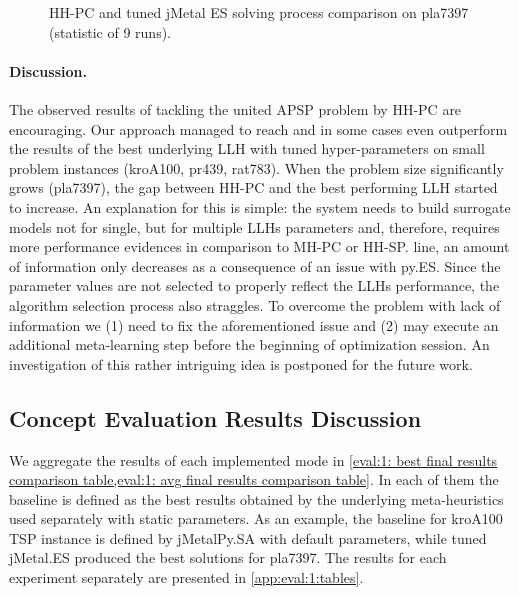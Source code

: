 \begin{figure}[h]
	\centering
	\vspace{-5pt}
	
	\caption{HH-PC and tuned jMetal ES solving process comparison on pla7397 (statistic of 9 runs).}
	\vspace{-5pt}
	\label{eval:pict:hh-pc vs jES on pla7397 process}
\end{figure}

\paragraph{Discussion.} The observed results of tackling the united APSP problem by HH-PC are encouraging. Our approach managed to reach and in some cases even outperform the results of the best underlying LLH with tuned hyper-parameters on small problem instances (kroA100, pr439, rat783). When the problem size significantly grows (pla7397), the gap between HH-PC and the best performing LLH started to increase. An explanation for this is simple: the system needs to build surrogate models not for single, but for multiple LLHs parameters and, therefore, requires more performance evidences in comparison to MH-PC or HH-SP. line, an amount of information only decreases as a consequence of an issue with py.ES. Since the parameter values are not selected to properly reflect the LLHs performance, the algorithm selection process also straggles. To overcome the problem with lack of information we (1) need to fix the aforementioned issue and (2) may execute an additional meta-learning step before the beginning of optimization session. An investigation of this rather intriguing idea is postponed for the future work.


\subsection{Concept Evaluation Results Discussion}
We aggregate the results of each implemented mode in \cref{eval:1: best final results comparison table,eval:1: avg final results comparison table}. In each of them the baseline is defined as the best results obtained by the underlying meta-heuristics used separately with static parameters. As an example, the baseline for kroA100 TSP instance is defined by jMetalPy.SA with default parameters, while tuned jMetal.ES produced the best solutions for pla7397. The results for each experiment separately are presented in \cref{app:eval:1:tables}.


